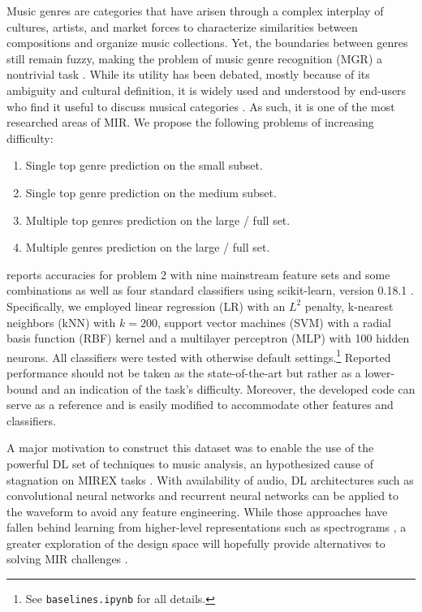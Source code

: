 \documentclass{article}
\begin{document}
Music genres are categories that have arisen through a complex interplay of cultures, artists, and market forces to characterize similarities between compositions and organize music collections. Yet, the boundaries between genres still remain fuzzy, making the problem of music genre recognition (MGR) a nontrivial task \cite{mir_review_genre}.
While its utility has been debated, mostly because of its ambiguity and cultural definition, it is widely used and understood by end-users who find it useful to discuss musical categories \cite{mgr_why}.
As such, it is one of the most researched areas of MIR.
We propose the following problems of increasing difficulty:
\begin{enumerate}
	\item Single top genre prediction on the small subset.
	\item Single top genre prediction on the medium subset.
	\item Multiple top genres prediction on the large / full set.
	\item Multiple genres prediction on the large / full set.
\end{enumerate}

 reports accuracies for problem 2 with nine mainstream feature sets and some combinations as well as four standard classifiers using scikit-learn, version 0.18.1 \cite{scikit-learn}. Specifically, we employed linear regression (LR) with an $L^2$ penalty, k-nearest neighbors (kNN) with $k=200$, support vector machines (SVM) with a radial basis function (RBF) kernel and a multilayer perceptron (MLP) with 100 hidden neurons. All classifiers were tested with otherwise default settings.\footnote{See \texttt{baselines.ipynb} for all details.} Reported performance should not be taken as the state-of-the-art but rather as a lower-bound and an indication of the task's difficulty. Moreover, the developed code can serve as a reference and is easily modified to accommodate other features and classifiers.

A major motivation to construct this dataset was to enable the use of the powerful DL set of techniques to music analysis, an hypothesized cause of stagnation on MIREX tasks \cite{mirex_stagnation}.
With availability of audio, DL architectures such as convolutional neural networks and recurrent neural networks can be applied to the waveform to avoid any feature engineering. While those approaches have fallen behind learning from higher-level representations such as spectrograms \cite{dieleman_endtoend}, a greater exploration of the design space will hopefully provide alternatives to solving MIR challenges \cite{mir_dl_feature_learning}.
\end{document}
